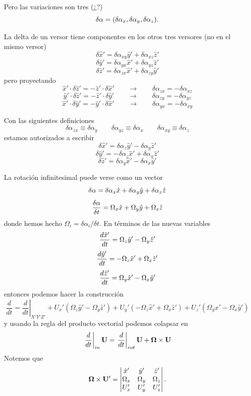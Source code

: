 \documentclass[10pt,oneside]{CBFT_book}
\begin{document}
Pero las variaciones son tres (¿?)
\[
	\delta\vb{\alpha} = ( \delta\alpha_x, \delta\alpha_y, \delta\alpha_z).
\]

La delta de un versor tiene componentes en los otros tres versores (no en el mismo versor)
\[
	\delta\hat{x}' = \delta \alpha_{xy}\hat{y}' + \delta \alpha_{xz}\hat{z}'
\]
\[
	\delta\hat{y}' = \delta \alpha_{yx}\hat{x}' + \delta \alpha_{yz}\hat{z}'
\]
\[
	\delta\hat{z}' = \delta \alpha_{zx}\hat{x}' + \delta \alpha_{zy}\hat{y}'
\]
pero proyectando
\[
	\hat{x}'\cdot\delta\hat{z}' =  - \hat{z}'\cdot\delta\hat{x}' \qquad \longrightarrow \qquad 
					\delta\alpha_{zx} = -\delta\alpha_{xz}
\]
\[
	\hat{y}'\cdot\delta\hat{z}' =  - \hat{z}'\cdot\delta\hat{y}' \qquad \longrightarrow  \qquad 
					\delta\alpha_{zy} = -\delta\alpha_{yz}
\]
\[
	\hat{x}'\cdot\delta\hat{y}' =  - \hat{y}'\cdot\delta\hat{x}' \qquad \longrightarrow  \qquad 
					\delta\alpha_{yx} = -\delta\alpha_{xy}
\]

Con las siguientes definiciones 
\[
	\delta\alpha_{zx} \equiv \delta\alpha_y \qquad 
	\delta\alpha_{yz} \equiv \delta\alpha_x \qquad
	\delta\alpha_{xy} \equiv \delta\alpha_z 
\]
estamos autorizados a escribir
\[
	\delta\hat{x}' = \delta \alpha_z \hat{y}' - \delta \alpha_y \hat{z}'
\]
\[
	\delta\hat{y}' = - \delta \alpha_z \hat{x}' + \delta \alpha_x \hat{z}'
\]
\[
	\delta\hat{z}' = \delta \alpha_y \hat{x}' - \delta \alpha_x \hat{y}'
\]

La rotación infinitesimal puede verse como un vector 
\[
	\delta\vb{\alpha} = \delta\alpha_x \hat{x} + \delta\alpha_y \hat{y} +  \delta\alpha_z \hat{z} 
\]
\[
	\frac{\delta\vb{\alpha}}{\delta t} = \Omega_x \hat{x} + \Omega_y \hat{y} +  \Omega_z \hat{z} 
\]
donde hemos hecho $\Omega_i = \delta\alpha_i/\delta t$. En términos de las nuevas variables
\[
	\frac{d^{\hspace{-0.05em}} {\hat{x}'}}{d {t}^{\hspace{-0.05em}}} = \Omega_z \hat{y}' - \Omega_y \hat{z}'
\]
\[
	\frac{d^{\hspace{-0.05em}} {\hat{y}'}}{d {t}^{\hspace{-0.05em}}} = - \Omega_z \hat{x}' + \Omega_x \hat{z}'
\]
\[
	\frac{d^{\hspace{-0.05em}} {\hat{z}'}}{d {t}^{\hspace{-0.05em}}} = \Omega_y \hat{x}' - \Omega_x \hat{y}'
\]
entonces podemos hacer la construcción
\[
	\frac{d}{dt} = \left.\frac{d}{dt} \right|_{X'Y'Z'} + U_x' ( \Omega_z \hat{y}' - \Omega_y \hat{z}' )
		+ U_y'( - \Omega_z \hat{x}' + \Omega_x \hat{z}' ) + U_z'( \Omega_y \hat{x}' - \Omega_x \hat{y}' )
\]
y usando la regla del producto vectorial podemos colapsar en 
\[
	\left.\frac{d}{dt}\right|_{in} \vb{U} = \left.\frac{d}{dt} \right|_{rot} \vb{U} + \vb{\Omega} \times \vb{U}
\]
Notemos que 
\[
	\vb{\Omega} \times \vb{U}' = \begin{vmatrix}
	                              \hat{x}' & \hat{y}' & \hat{z}' \\
	                              \Omega_x & \Omega_y  & \Omega_z \\
	                              U_x' & U_y' & U_z' 
	                             \end{vmatrix}.
\]
\end{document}
